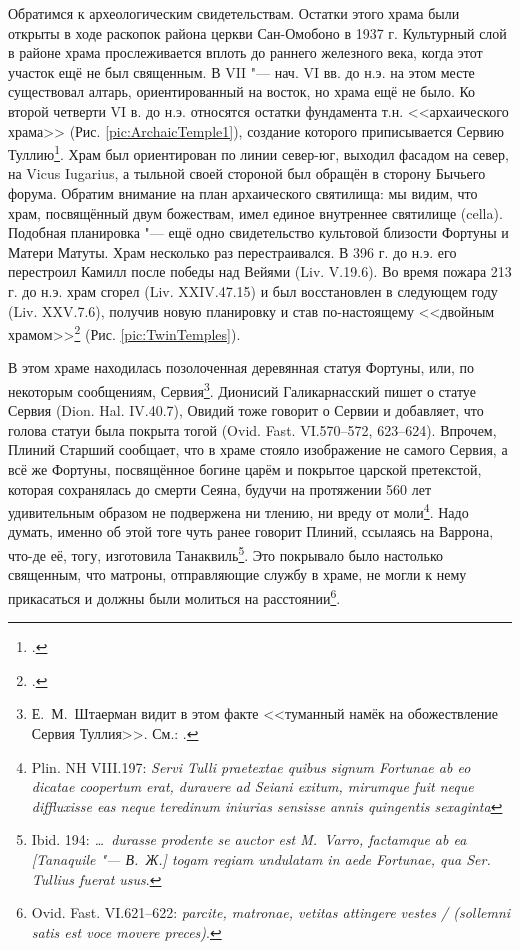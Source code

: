 
\label{Archaeologia}Обратимся к археологическим свидетельствам. Остатки этого храма были открыты в ходе раскопок района церкви Сан-Омобоно в 1937 г. Культурный слой в районе храма прослеживается вплоть до раннего железного века, когда этот участок ещё не был священным. В VII "--- нач. VI вв. до н.э. на этом месте существовал алтарь, ориентированный на восток, но храма ещё не было. Ко второй четверти VI в. до н.э. относятся остатки фундамента т.н. <<архаического храма>> (Рис. \ref{pic:ArchaicTemple1}), создание которого приписывается Сервию Туллию\footcite[P. 246]{Richardson1992}. Храм был ориентирован по линии север-юг, выходил фасадом на север, на Vicus Iugarius, а тыльной своей стороной был обращён в сторону Бычьего форума. Обратим внимание на план архаического святилища: мы видим, что храм, посвящённый двум божествам, имел единое внутреннее святилище (cella). Подобная планировка "--- ещё одно свидетельство культовой близости Фортуны и Матери Матуты. Храм несколько раз перестраивался. В 396 г. до н.э. его перестроил Камилл после победы над Вейями (Liv. V.19.6). Во время пожара 213 г. до н.э. храм сгорел (Liv. XXIV.47.15) и был восстановлен в следующем году (Liv. XXV.7.6), получив новую планировку и став по-настоящему <<двойным храмом>>\footcite[P. 35, 246]{Richardson1992} (Рис. \ref{pic:TwinTemples}).



В этом храме находилась позолоченная деревянная статуя Фортуны, или, по некоторым сообщениям, Сервия\footnote{Е.~М.~Штаерман видит в этом факте <<туманный намёк на обожествление Сервия Туллия>>. См.: \cite[С. 47--48]{Shtaerman1987}.}. Дионисий Галикарнасский пишет о статуе Сервия (Dion. Hal. IV.40.7), Овидий тоже говорит о Сервии и добавляет, что голова статуи была покрыта тогой (Ovid. Fast. VI.570--572, 623--624). Впрочем, Плиний Старший сообщает, что в храме стояло изображение не самого Сервия, а всё же Фортуны, посвящённое богине царём и покрытое царской претекстой, которая сохранялась до смерти Сеяна, будучи на протяжении 560 лет удивительным образом не подвержена ни тлению, ни вреду от моли\footnote{Plin. NH VIII.197: \textit{Servi Tulli praetextae quibus signum Fortunae ab eo dicatae coopertum erat, duravere ad Seiani exitum, mirumque fuit neque diffluxisse eas neque teredinum iniurias sensisse annis quingentis sexaginta}}. Надо думать, именно об этой тоге чуть ранее говорит Плиний, ссылаясь на Варрона, что-де её, тогу, изготовила Танаквиль\footnote{Ibid. 194: \textit{\ldots{}~durasse prodente se auctor est M.~Varro, factamque ab ea [Tanaquile "--- В.~Ж.] togam regiam undulatam in aede Fortunae, qua Ser. Tullius fuerat usus}.}. Это покрывало было настолько священным, что матроны, отправляющие службу в храме, не могли к нему прикасаться и должны были молиться на расстоянии\footnote{Ovid. Fast. VI.621--622: \textit{parcite, matronae, vetitas attingere vestes / (sollemni satis est voce movere preces)}.}. 

